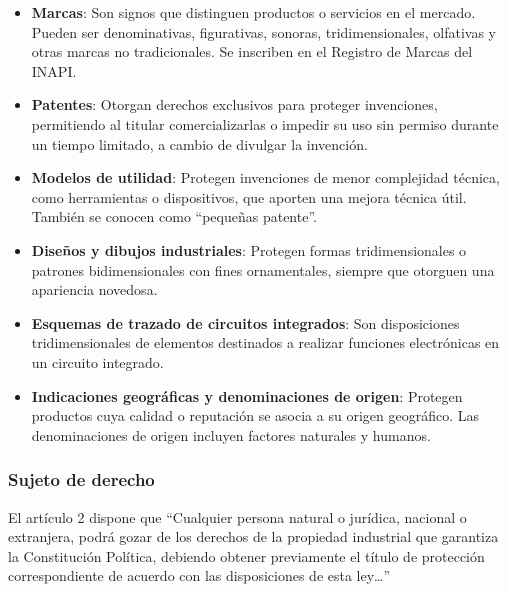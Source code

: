 \documentclass{templateNote}
\begin{document}
\begin{itemize}
    \item \textbf{Marcas}: Son signos que distinguen productos o servicios en el mercado. Pueden ser denominativas, figurativas, sonoras, tridimensionales, olfativas y otras marcas no tradicionales. Se inscriben en el Registro de Marcas del INAPI.

    \item \textbf{Patentes}: Otorgan derechos exclusivos para proteger invenciones, permitiendo al titular comercializarlas o impedir su uso sin permiso durante un tiempo limitado, a cambio de divulgar la invención.
    
    \item \textbf{Modelos de utilidad}: Protegen invenciones de menor complejidad técnica, como herramientas o dispositivos, que aporten una mejora técnica útil. También se conocen como ``pequeñas patente''.
    
    \item \textbf{Diseños y dibujos industriales}: Protegen formas tridimensionales o patrones bidimensionales con fines ornamentales, siempre que otorguen una apariencia novedosa.
    
    \item \textbf{Esquemas de trazado de circuitos integrados}: Son disposiciones tridimensionales de elementos destinados a realizar funciones electrónicas en un circuito integrado.
    
    \item \textbf{Indicaciones geográficas y denominaciones de origen}: Protegen productos cuya calidad o reputación se asocia a su origen geográfico. Las denominaciones de origen incluyen factores naturales y humanos.
\end{itemize}

\subsubsection{Sujeto de derecho}
El artículo 2 dispone que “Cualquier persona natural o jurídica, nacional o extranjera, podrá gozar de los derechos de la propiedad industrial que garantiza la Constitución Política, debiendo obtener previamente el título de protección correspondiente de acuerdo con las disposiciones de esta ley…”
\end{document}
